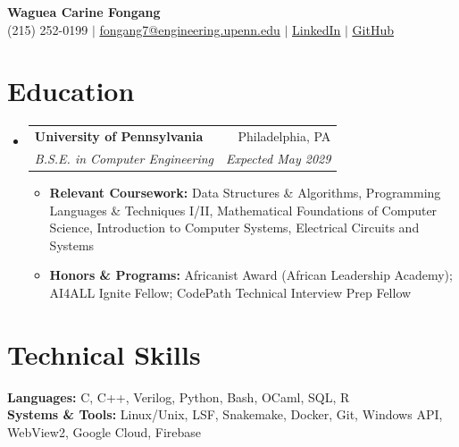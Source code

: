 \documentclass[letterpaper,10pt]{article}
\makeatletter
\newcommand{\resumeItem}[1]{\item \small{#1}}
\newcommand{\resumeSubheading}[4]{
\item \begin{tabularx}{\linewidth}{@{}X r@{}}
\textbf{#1} & \small #2 \\
\textit{\small #3} & \textit{\small #4}
\end{tabularx}\vspace{-2pt}
}
\newcommand{\resumeSubHeadingListStart}{
\begin{itemize}[
leftmargin=0pt,label={},itemsep=2pt,
topsep=2pt,parsep=0pt,partopsep=0pt
]
}
\newcommand{\resumeSubHeadingListEnd}{
\end{itemize}\vspace{2pt}
}
\newcommand{\resumeItemListStart}{
\begin{itemize}[
leftmargin=0.18in,label=\textbullet,
itemsep=1pt,topsep=1pt,parsep=0pt,partopsep=0pt
]
}
\newcommand{\resumeItemListEnd}{
\end{itemize}\vspace{1pt}
}
\makeatother
\begin{document}
\begin{center}
{\huge\textbf{Waguea Carine Fongang}} \\[3pt]
\small (215) 252-0199 $|$
\href{mailto:fongang7@engineering.upenn.edu}
{fongang7@engineering.upenn.edu} $|$
\href{https://www.linkedin.com/in/fongangcarine}
{\underline{LinkedIn}} $|$
\href{https://github.com/waguea}
{\underline{GitHub}}
\end{center}
\vspace{-12pt}
\section{Education}
\resumeSubHeadingListStart
\resumeSubheading
{University of Pennsylvania}
{Philadelphia, PA}
{B.S.E. in Computer Engineering}
{Expected May 2029}
\resumeItemListStart
\resumeItem{
\textbf{Relevant Coursework:} Data Structures \& Algorithms, Programming Languages \& Techniques I/II, Mathematical Foundations of Computer Science, Introduction to Computer Systems, Electrical Circuits and Systems
}
\resumeItem{
\textbf{Honors \& Programs:} Africanist Award (African Leadership Academy); AI4ALL Ignite Fellow; CodePath Technical Interview Prep Fellow
}
\resumeItemListEnd
\resumeSubHeadingListEnd
\section{Technical Skills}
{\small
\textbf{Languages:} C, C++, Verilog, Python, Bash, OCaml, SQL, R \\[2pt]
\textbf{Systems \& Tools:} Linux/Unix, LSF, Snakemake, Docker, Git, Windows API, WebView2, Google Cloud, Firebase
}
\end{document}
